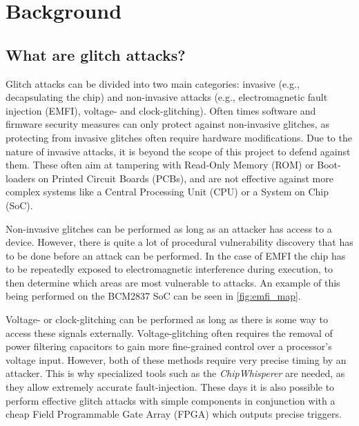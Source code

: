 

\chapter{Background}
\label{chap3}

\section{What are glitch attacks?}

Glitch attacks can be divided into two main categories: invasive (e.g., decapsulating the chip\cite{intro_to_hw_hacking}) and non-invasive attacks (e.g., electromagnetic fault injection (EMFI), voltage- and clock-glitching). Often times software and firmware security measures can only protect against non-invasive glitches, as protecting from invasive glitches often require hardware modifications\cite{glitchresistor}. Due to the nature of invasive attacks, it is beyond the scope of this project to defend against them. These often aim at tampering with Read-Only Memory (ROM) or Boot-loaders on Printed Circuit Boards (PCBs), and are not effective against more complex systems like a Central Processing Unit (CPU) or a System on Chip (SoC). 

Non-invasive glitches can be performed as long as an attacker has access to a device. However, there is quite a lot of procedural vulnerability discovery that has to be done before an attack can be performed. In the case of EMFI the chip has to be repeatedly exposed to electromagnetic interference during execution, to then determine which areas are most vulnerable to attacks\cite{emfi_injection}. An example of this being performed on the BCM2837 SoC can be seen in \autoref{fig:emfi_map}\cite{emfi_injection}. 

Voltage- or clock-glitching can be performed as long as there is some way to access these signals externally. Voltage-glitching often requires the removal of power filtering capacitors to gain more fine-grained control over a processor's voltage input. However, both of these methods require very precise timing by an attacker. This is why specialized tools such as the \textit{ChipWhisperer}\cite{chipWhisperer} are needed, as they allow extremely accurate fault-injection. These days it is also possible to perform effective glitch attacks with simple components in conjunction with a cheap Field Programmable Gate Array (FPGA) which outputs precise triggers\cite{hole_in_soc}. 

